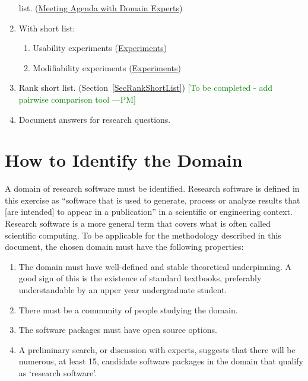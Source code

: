 \documentclass[letterpaper,cleveref]{lipics-v2019}
\newcommand{\authornote}[3]{\textcolor{#1}{[#3 ---#2]}}
\newcommand{\authornote}[3]{}
\newcommand{\wss}[1]{\authornote{blue}{SS}{#1}} %
\newcommand{\pmi}[1]{\authornote{green}{PM}{#1}} %
\theoremstyle{definition}
\begin{document}
\begin{enumerate}
  list. (\href{https://github.com/smiths/AIMSS/blob/master/StateOfPractice/Methodology/Meeting
    Agenda withmDomainmExperts.pdf}{Meeting Agenda with Domain Experts})
\item With short list:
\begin{enumerate}
\item Usability experiments
  (\href{https://github.com/smiths/AIMSS/blob/master/StateOfPractice/Methodology/Experiments.pdf}{Experiments})
\item Modifiability experiments
  (\href{https://github.com/smiths/AIMSS/blob/master/StateOfPractice/Methodology/Experiments.pdf}{Experiments})
\end{enumerate}
\item Rank short list. (Section~\ref{SecRankShortList}) \pmi{To be completed -
    add pairwise comparison tool}
\item Document answers for research questions.
\end{enumerate}


\section{How to Identify the Domain} \label{SecIdentifyDomain} 

A domain of research software must be identified. Research software is defined
in this exercise as ``software that is used to generate, process or analyze
results that [are intended] to appear in a publication'' \citep{hettrick2014uk}
in a scientific or engineering context.  Research software is a more general
term that covers what is often called scientific computing.  To be applicable
for the methodology described in this document, the chosen domain must have the
following properties:

\begin{enumerate}
\item The domain must have well-defined and stable theoretical underpinning.  A
  good sign of this is the existence of standard textbooks, preferably
  understandable by an upper year undergraduate student.
\item There must be a community of people studying the domain.
\item The software packages must have open source options.
\item A preliminary search, or discussion with experts, suggests that there will
  be numerous, at least 15, candidate software packages in the domain that
  qualify as `research software'.
\end{enumerate}	
\end{document}
